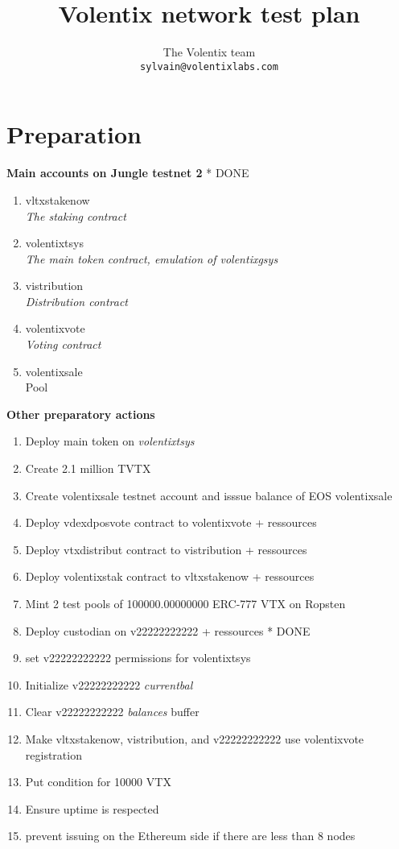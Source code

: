 \documentclass[]{article}
\title{Volentix network test plan}
\author{
		The Volentix team\\
	\texttt{sylvain@volentixlabs.com}
}
\begin{document}
\maketitle


\section{Preparation}

\textbf{Main accounts on Jungle testnet 2}  * {\color{green} DONE}
	
  \begin{enumerate}
  \item  vltxstakenow\\
\textit{  The staking contract}
  \item volentixtsys \\
  \textit{  The main token contract, emulation of volentixgsys}
  \item vistribution\\
  \textit{Distribution contract}
  \item volentixvote \\
  \textit{  Voting contract}
    \item volentixsale \\
		Pool
 
\end{enumerate}
 \textbf{Other preparatory actions}
  		\begin{enumerate}
  		  \item Deploy main token on \textit{volentixtsys}
  		  \item Create 2.1 million TVTX
  		  \item Create volentixsale testnet account and isssue balance of EOS volentixsale
  		  \item Deploy vdexdposvote contract to volentixvote + ressources
  		  \item Deploy vtxdistribut contract to vistribution + ressources
  		  \item Deploy volentixstak  contract to vltxstakenow + ressources
 		  \item Mint 2 test pools of 100000.00000000 ERC-777 VTX on Ropsten 
		  \item Deploy custodian on v22222222222 + ressources  * {\color{green} DONE}
		  \item set v22222222222 permissions for volentixtsys
		  \item Initialize v22222222222 \textit{currentbal}
		  \item Clear v22222222222 \textit{balances} buffer
		  \item Make vltxstakenow, vistribution, and v22222222222 use volentixvote registration
		  \item Put condition for 10000 VTX
		  \item Ensure uptime is respected 
		  \item prevent issuing on the Ethereum side if there are less than 8 nodes
		   
	 \end{enumerate}
\end{document}
